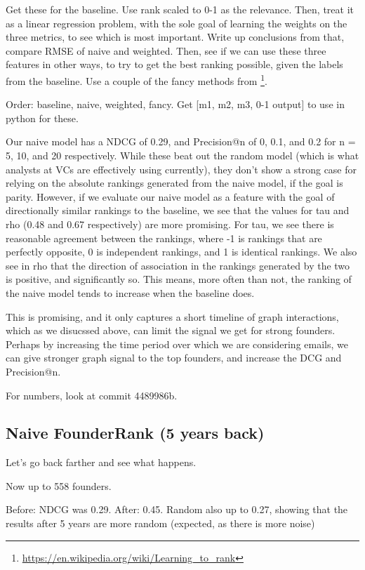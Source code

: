 Get these for the baseline. Use rank scaled to 0-1 as the relevance.
Then, treat it as a linear regression problem, with the sole goal of learning the weights on the three metrics, to see which is most important. Write up conclusions from that, compare RMSE of naive and weighted.
Then, see if we can use these three features in other ways, to try to get the best ranking possible, given the labels from the baseline. Use a couple of the fancy methods from \footnote{\url{https://en.wikipedia.org/wiki/Learning_to_rank}}.

Order: baseline, naive, weighted, fancy.
Get [m1, m2, m3, 0-1 output] to use in python for these.

Our naive model has a NDCG of 0.29, and Precision@n of 0, 0.1, and 0.2 for n = 5, 10, and 20 respectively. While these beat out the random model (which is what analysts at VCs are effectively using currently), they don't show a strong case for relying on the absolute rankings generated from the naive model, if the goal is parity. However, if we evaluate our naive model as a feature with the goal of directionally similar rankings to the baseline, we see that the values for tau and rho (0.48 and 0.67 respectively) are more promising. For tau, we see there is reasonable agreement between the rankings, where -1 is rankings that are perfectly opposite, 0 is independent rankings, and 1 is identical rankings. We also see in rho that the direction of association in the rankings generated by the two is positive, and significantly so. This means, more often than not, the ranking of the naive model tends to increase when the baseline does.

This is promising, and it only captures a short timeline of graph interactions, which as we disucssed above, can limit the signal we get for strong founders. Perhaps by increasing the time period over which we are considering emails, we can give stronger graph signal to the top founders, and increase the DCG and Precision@n.

For numbers, look at commit 4489986b.

\subsection{Naive FounderRank (5 years back)}

Let's go back farther and see what happens.

Now up to 558 founders.

Before: NDCG was 0.29.
After: 0.45. Random also up to 0.27, showing that the results after 5 years are more random (expected, as there is more noise)

